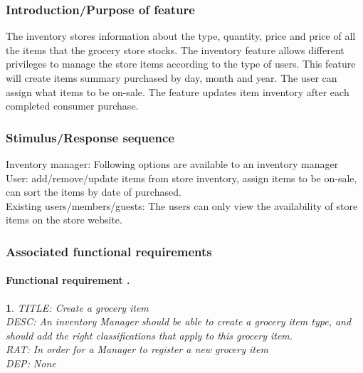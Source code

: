 \documentclass{scrreprt}
\theoremstyle{funreq}
\newtheorem{funreq}{}
\newcommand*{\reqref}[1]{\hyperref[#1]{FR\ref*{#1}}}
\begin{document}
	\subsubsection{Introduction/Purpose of feature}
	The inventory stores information about the type, quantity, price and price of all the items that the grocery store stocks. The inventory feature allows different privileges to manage the store items according to the type of users. This feature will create items summary purchased by day, month and year. The user can assign what items to be on-sale. The feature updates item inventory after each completed consumer purchase.
	
	\subsubsection{Stimulus/Response sequence}
	Inventory manager: Following options are available to an inventory manager \\
	User: add/remove/update items from store inventory, assign items to be on-sale, can sort the items by date of purchased.\\
	Existing users/members/guests:  The users can only view the availability of store items on the store website.\\
	
	\subsubsection{Associated functional requirements}
	\paragraph[]{Functional requirement .}
	\begin{funreq}
		
		\label{inventory_create}
		TITLE: Create a grocery item\\
		DESC: An inventory Manager should be able to create a grocery item type, and should add the right classifications that apply to this grocery item. \\
		RAT: In order for a Manager to register a new grocery item\\
		DEP: None\\
	\end{funreq}
	
	
\end{document}
